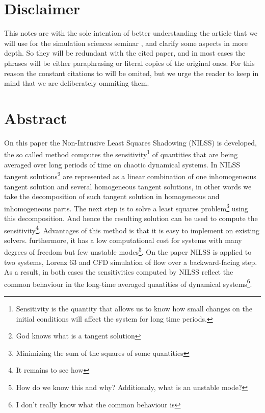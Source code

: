 \documentclass[12pt,twoside,a4paper]{article} %
\begin{document}

\tableofcontents %

\newpage %



\section*{Disclaimer}
This notes are with the sole intention of better understanding the article that we will use for the simulation sciences seminar \cite{Wang}, and clarify some aspects in more depth. So they will be redundant with the cited paper, and in most cases the phrases will be either paraphrasing or literal copies of the original ones. For this reason the constant citations to \cite{Wang} will be omited, but we urge the reader to keep in mind that we are deliberately ommiting them.
\section{Abstract}
On this paper the Non-Intrusive Least Squares Shadowing (NILSS) is developed, the so called method computes the sensitivity\footnote{Sensitivity is the quantity that allows us to know how small changes on the initial conditions will affect the system for long time periods.} of quantities that are being averaged over long periods of time on chaotic dynamical systems. In NILSS tangent solutions\footnote{God knows what is a tangent solution} are represented as a linear combination of one inhomogeneous tangent solution and several homogeneous tangent solutions, in other words we take the decomposition of such tangent solution in homogeneous and inhomogeneous parts. The next step is to solve a least squares problem\footnote{Minimizing the sum of the squares of some quantities} using this decomposition. And hence the resulting solution can be used to compute the sensitivity\footnote{It remains to see how}. Advantages of this method is that it is easy to implement on existing solvers. furthermore, it has a low computational cost for systems with many degrees of freedom but few unstable modes\footnote{How do we know this and why? Additionaly, what is an unstable mode?}. On the paper NILSS is applied to two systems, Lorenz 63 and CFD simulation of flow over a backward-facing step. As a result, in both cases the sensitivities computed by NILSS reflect the common behaviour in the long-time averaged quantities of dynamical systems\footnote{I don't really know what the common behaviour is}.
\end{document}
